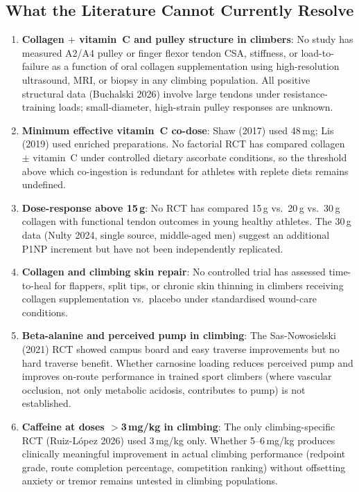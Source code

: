 \subsection{What the Literature Cannot Currently Resolve}
\label{subsec:suppgaps}

\begin{enumerate}[noitemsep]

  \item \textbf{Collagen $+$ vitamin~C and pulley structure in climbers}: No study has measured A2/A4 pulley or finger flexor tendon CSA, stiffness, or load-to-failure as a function of oral collagen supplementation using high-resolution ultrasound, MRI, or biopsy in any climbing population. All positive structural data (Buchalski 2026) involve large tendons under resistance-training loads; small-diameter, high-strain pulley responses are unknown.

  \item \textbf{Minimum effective vitamin~C co-dose}: Shaw (2017) used 48\,mg; Lis (2019) used enriched preparations. No factorial RCT has compared collagen $\pm$ vitamin~C under controlled dietary ascorbate conditions, so the threshold above which co-ingestion is redundant for athletes with replete diets remains undefined.

  \item \textbf{Dose-response above 15\,g}: No RCT has compared 15\,g vs.\ 20\,g vs.\ 30\,g collagen with functional tendon outcomes in young healthy athletes. The 30\,g data (Nulty 2024, single source, middle-aged men) suggest an additional P1NP increment but have not been independently replicated.

  \item \textbf{Collagen and climbing skin repair}: No controlled trial has assessed time-to-heal for flappers, split tips, or chronic skin thinning in climbers receiving collagen supplementation vs.\ placebo under standardised wound-care conditions.

  \item \textbf{Beta-alanine and perceived pump in climbing}: The Sas-Nowosielski (2021) RCT showed campus board and easy traverse improvements but no hard traverse benefit. Whether carnosine loading reduces perceived pump and improves on-route performance in trained sport climbers (where vascular occlusion, not only metabolic acidosis, contributes to pump) is not established.

  \item \textbf{Caffeine at doses $>$3\,mg/kg in climbing}: The only climbing-specific RCT (Ruiz-L\'opez 2026) used 3\,mg/kg only. Whether 5--6\,mg/kg produces clinically meaningful improvement in actual climbing performance (redpoint grade, route completion percentage, competition ranking) without offsetting anxiety or tremor remains untested in climbing populations.


\end{enumerate}

